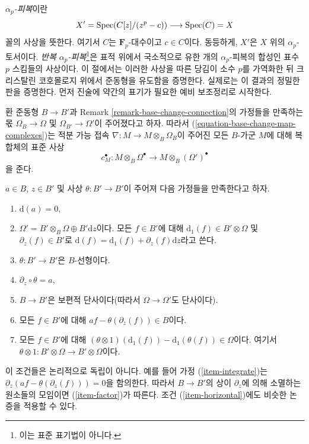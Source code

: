 \noindent
{\it $\alpha_p$-피복}이란
$$
X' = \mathop{\mathrm{Spec}}(C[z]/(z^p - c)) \longrightarrow \mathop{\mathrm{Spec}}(C) = X
$$
꼴의 사상을 뜻한다. 여기서 $C$는 $\mathbf{F}_p$-대수이고 $c \in C$이다.
동등하게, $X'$은 $X$ 위의 $\alpha_p$-토서이다. {\it 반복
$\alpha_p$-피복}\footnote{이는 표준 표기법이 아니다.}은 표적 위에서
국소적으로 유한 개의 $\alpha_p$-피복의 합성인 표수 $p$ 스킴들의
사상이다. 이 절에서는 이러한 사상을 따른 당김이 소수 $p$를 가역화한
뒤 크리스탈린 코호몰로지 위에서 준동형을 유도함을 증명한다. 실제로는
이 결과의 정밀한 판을 증명한다. 먼저 진술에 약간의 표기가 필요한
예비 보조정리로 시작한다.

\medskip\noindent
환 준동형 $B \to B'$과 Remark \ref{remark-base-change-connection}의
가정들을 만족하는 몫 $\Omega_B \to \Omega$ 및
$\Omega_{B'} \to \Omega'$이 주어졌다고 하자. 따라서
(\ref{equation-base-change-map-complexes})는 적분 가능 접속
$\nabla : M \to M \otimes_B \Omega_B$이 주어진 모든 $B$-가군 $M$에
대해 복합체의 표준 사상
$$
c_M^\bullet :
M \otimes_B \Omega^\bullet
\longrightarrow
M \otimes_B (\Omega')^\bullet
$$
을 준다.

\medskip\noindent
$a \in B$, $z \in B'$ 및 사상 $\theta : B' \to B'$이 주어져 다음
가정들을 만족한다고 하자.
\begin{enumerate}
\item
\label{item-d-a-zero}
$\text{d}(a) = 0$,
\item
\label{item-direct-sum}
$\Omega' = B' \otimes_B \Omega \oplus B'\text{d}z$이다. 모든
$f \in B'$에 대해 $\text{d}_1(f) \in B' \otimes \Omega$ 및
$\partial_z(f) \in B'$로
$\text{d}(f) = \text{d}_1(f) + \partial_z(f) \text{d}z$라고 쓴다.
\item
\label{item-theta-linear}
$\theta : B' \to B'$은 $B$-선형이다.
\item
\label{item-integrate}
$\partial_z \circ \theta = a$,
\item
\label{item-injective}
$B \to B'$은 보편적 단사이다(따라서 $\Omega \to \Omega'$도
단사이다).
\item
\label{item-factor}
모든 $f \in B'$에 대해 $af - \theta(\partial_z(f)) \in B$이다.
\item
\label{item-horizontal}
모든 $f \in B'$에 대해
$(\theta \otimes 1)(\text{d}_1(f)) - \text{d}_1(\theta(f)) \in \Omega$이다.
여기서 $\theta \otimes 1 : B' \otimes \Omega \to B' \otimes \Omega$이다.
\end{enumerate}
이 조건들은 논리적으로 독립이 아니다. 예를 들어 가정
(\ref{item-integrate})는
$\partial_z(af - \theta(\partial_z(f))) = 0$을 함의한다. 따라서
$B \to B'$의 상이 $\partial_z$에 의해 소멸하는 원소들의 모임이면
(\ref{item-factor})가 따른다. 조건 (\ref{item-horizontal})에도 비슷한
논증을 적용할 수 있다.

